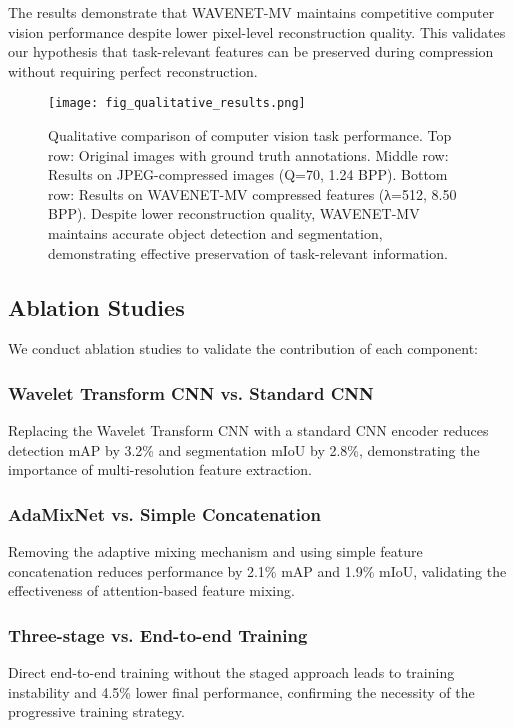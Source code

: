 \documentclass[conference]{IEEEtran}
\begin{document}
The results demonstrate that WAVENET-MV maintains competitive computer vision performance despite lower pixel-level reconstruction quality. This validates our hypothesis that task-relevant features can be preserved during compression without requiring perfect reconstruction.

\begin{figure*}[htbp]
\centerline{\texttt{[image: fig\_qualitative\_results.png]}}
\caption{Qualitative comparison of computer vision task performance. Top row: Original images with ground truth annotations. Middle row: Results on JPEG-compressed images (Q=70, 1.24 BPP). Bottom row: Results on WAVENET-MV compressed features (λ=512, 8.50 BPP). Despite lower reconstruction quality, WAVENET-MV maintains accurate object detection and segmentation, demonstrating effective preservation of task-relevant information.}
\label{fig:qualitative}
\end{figure*}

\subsection{Ablation Studies}

We conduct ablation studies to validate the contribution of each component:

\subsubsection{Wavelet Transform CNN vs. Standard CNN}
Replacing the Wavelet Transform CNN with a standard CNN encoder reduces detection mAP by 3.2\% and segmentation mIoU by 2.8\%, demonstrating the importance of multi-resolution feature extraction.

\subsubsection{AdaMixNet vs. Simple Concatenation}
Removing the adaptive mixing mechanism and using simple feature concatenation reduces performance by 2.1\% mAP and 1.9\% mIoU, validating the effectiveness of attention-based feature mixing.

\subsubsection{Three-stage vs. End-to-end Training}
Direct end-to-end training without the staged approach leads to training instability and 4.5\% lower final performance, confirming the necessity of the progressive training strategy.
\end{document}
